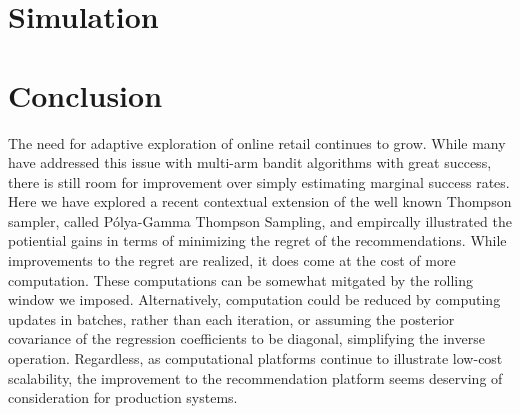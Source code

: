 \documentclass[12pt]{article}
\begin{document}
\section{Simulation}


\section{Conclusion}

The need for adaptive exploration of online retail continues to grow.  
While many have addressed this issue with multi-arm bandit algorithms with great
success, there is still room for improvement over simply estimating marginal
success rates.
Here we have explored a recent contextual extension of the well known Thompson
sampler, called P\'olya-Gamma Thompson Sampling, and empircally illustrated the 
potiential gains in terms of minimizing the regret of the recommendations.
While improvements to the regret are realized, it does come at the cost of more
computation.
These computations can be somewhat mitgated by the rolling window we imposed.
Alternatively, computation could be reduced by computing updates in batches, 
rather than each iteration, or assuming the posterior covariance of the regression
coefficients to be diagonal, simplifying the inverse operation.
Regardless, as computational platforms continue to illustrate low-cost scalability,
the improvement to the recommendation platform seems deserving of consideration
for production systems.



\end{document}

